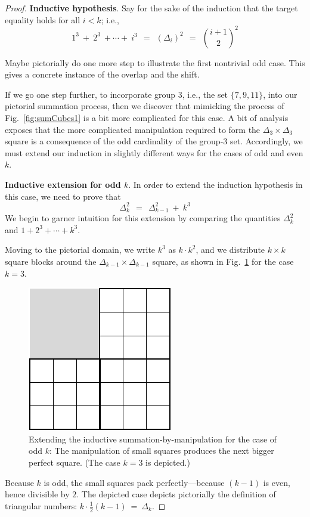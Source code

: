 \begin{proof}
\medskip

{\bf Inductive hypothesis}.
Say for the sake of the induction that the target equality holds for all $i < k$; i.e.,
\[ 1^3 \ + \ 2^3 \ + \cdots + \ i^3 \ \ = \ \ (\Delta_i)^2 \ \ = \ \ {{i+1} \choose 2}^2 \]

\medskip

{\Arny Maybe pictorially do one more step to illustrate the first nontrivial odd case.  This gives
a concrete instance of the overlap and the shift.}

\medskip

If we go one step further, to incorporate group $3$, i.e., the set $\{7, 9, 11\}$, into our
pictorial summation process, then we discover that mimicking the process of
Fig.~\ref{fig:sumCubes1} is a bit more complicated for this case.  A bit of analysis
exposes that the more complicated manipulation required to form the $\Delta_3 \times \Delta_3$
square is a consequence of the odd cardinality of the group-$3$ set.  Accordingly, we must extend
our induction in slightly different ways for the cases of odd and even $k$.

\medskip

{\bf Inductive extension for odd $k$}.
In order to extend the induction hypothesis in this case, we need to prove that
\[ \Delta_k^2 \ \ = \ \ \Delta_{k-1}^2 \ + \ k^3 \]
We begin to garner intuition for this extension by comparing the quantities  
$\Delta_k^2$ and $1 + 2^3 + \cdots + k^3$.

Moving to the pictorial domain, we write $k^3$ as $k \cdot k^2$, and we
distribute $k \times k$ square blocks around the $\Delta_{k-1} \times \Delta_{k-1}$
square, as shown in Fig.~\ref{fig:sumCubes3} for the case $k=3$. 
\begin{figure}[ht]
\begin{center}
       \includegraphics[scale=0.4]{FiguresMaths/SumCubes3}
\caption{Extending the inductive summation-by-manipulation for the case of odd $k$:
The manipulation of small squares produces the next bigger perfect square. 
(The case $k=3$ is depicted.)}
       \label{fig:sumCubes3}
\end{center}
\end{figure}
Because $k$ is odd, the small squares pack perfectly---because $(k-1)$ is even,
hence divisible by $2$.   The depicted case depicts pictorially the definition of triangular numbers:
$k \cdot \frac{1}{2}(k-1) \ = \ \Delta_k$.


\end{proof}
